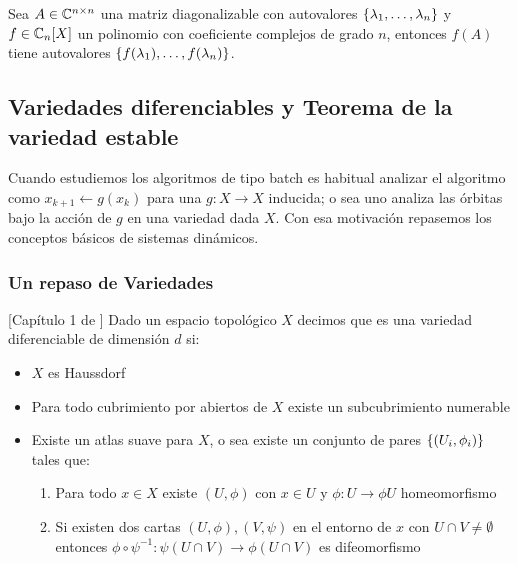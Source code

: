 \begin{corollary}
	Sea $A \in \mathbb{C}^{n \times n}$ una matriz diagonalizable con autovalores $\left\lbrace\lambda_1, \dots, \lambda_n\right\rbrace$ y $f \in \mathbb{C}_n[X]$ un polinomio con coeficiente complejos de grado $n$, entonces $f(A)$ tiene autovalores $\left\lbrace f(\lambda_1), \dots, f(\lambda_n)\right\rbrace$.
\end{corollary}

\subsection{Variedades diferenciables y Teorema de la variedad estable}

Cuando estudiemos los algoritmos de tipo batch es habitual analizar el algoritmo como $x_{k+1} \gets g(x_k)$ para una $g : X \rightarrow X$ inducida; o sea uno analiza las \'orbitas bajo la acci\'on de $g$ en una variedad dada $X$. Con esa motivaci\'on repasemos los conceptos b\'asicos de sistemas din\'amicos.

\subsubsection{Un repaso de Variedades}

\begin{definition}{[Cap\'itulo 1 de \cite{lee:00}]}
	Dado un espacio topol\'ogico $X$ decimos que es una variedad diferenciable de dimensi\'on $d$ si:
	
	\begin{itemize}
		\item $X$ es Haussdorf
		\item Para todo cubrimiento por abiertos de $X$ existe un subcubrimiento numerable
		\item Existe un atlas suave para $X$, o sea existe un conjunto de pares $\left\lbrace\left(U_i, \phi_i\right)\right\rbrace$ tales que:
		
		\begin{enumerate}
			\item Para todo $x \in X$ existe $(U,\phi)$ con $x \in U$ y $\phi: U \rightarrow \phi{U}$ homeomorfismo
			\item Si existen dos cartas $(U,\phi), (V,\psi)$ en el entorno de $x$ con $U \cap V \neq \emptyset$ entonces $\phi \circ \psi^{-1} : \psi(U\cap V )\rightarrow \phi(U\cap V)$ es difeomorfismo
		\end{enumerate}
	\end{itemize}
	
\end{definition}

